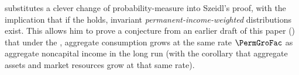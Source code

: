 \documentclass[BufferStockTheory]{subfiles}
\begin{document}
\cite{harmenbergInvariant} substitutes a clever change of probability-measure into Szeidl's proof, with the implication that if the {\GICRaw} holds, invariant \emph{permanent-income-weighted} distributions exist.  %
This allows him to prove a conjecture from an earlier draft of this paper (\cite{BufferStockTheoryQESubmit}) that under the {\GICRaw}, aggregate consumption grows at the same rate $\PermGroFac$ as aggregate noncapital income in the long run (with the corollary that aggregate assets and market resources grow at that same rate). \hypertarget{test-Harmenbergs-method}{}
\end{document}
